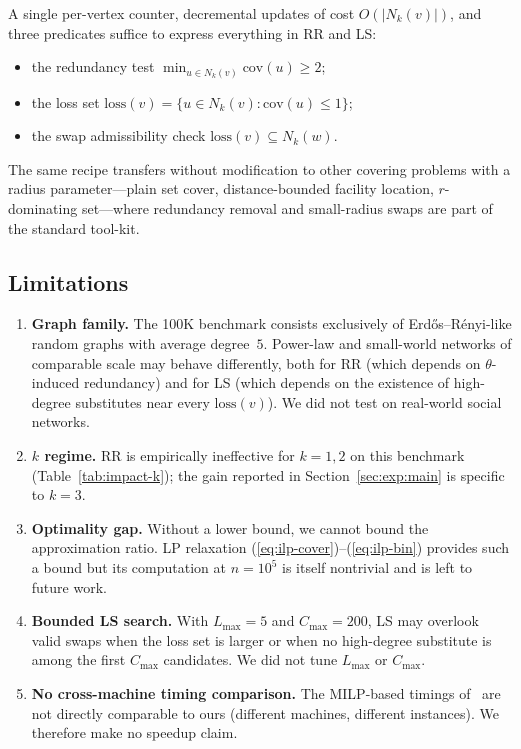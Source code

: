 \documentclass[11pt,a4paper]{article}
\newcommand{\cov}{\mathrm{cov}}
\newcommand{\loss}{\mathrm{loss}}
\begin{document}
A single per-vertex counter, decremental updates of cost
$O(|N_k(v)|)$, and three predicates suffice to express everything in
RR and LS:
\begin{itemize}[nosep]
  \item the redundancy test $\min_{u\in N_k(v)}\cov(u)\ge 2$;
  \item the loss set $\loss(v)=\{u\in N_k(v):\cov(u)\le 1\}$;
  \item the swap admissibility check $\loss(v)\subseteq N_k(w)$.
\end{itemize}
The same recipe transfers without modification to other covering
problems with a radius parameter—plain set cover, distance-bounded
facility location, $r$-dominating set—where redundancy removal and
small-radius swaps are part of the standard tool-kit.


\subsection{Limitations}

\begin{enumerate}[nosep]
  \item \textbf{Graph family.} The 100K benchmark consists exclusively
    of Erd\H{o}s--R\'enyi-like random graphs with average degree~$5$.
    Power-law and small-world networks of comparable scale may behave
    differently, both for RR (which depends on $\theta$-induced
    redundancy) and for LS (which depends on the existence of
    high-degree substitutes near every $\loss(v)$). We did not test on
    real-world social networks.
  \item \textbf{$k$ regime.} RR is empirically ineffective for
    $k=1,2$ on this benchmark
    (Table~\ref{tab:impact-k}); the gain reported in
    Section~\ref{sec:exp:main} is specific to $k=3$.
  \item \textbf{Optimality gap.} Without a lower bound, we cannot bound
    the approximation ratio. LP relaxation
    (\ref{eq:ilp-cover})--(\ref{eq:ilp-bin}) provides such a bound but
    its computation at $n=10^5$ is itself nontrivial and is left to
    future work.
  \item \textbf{Bounded LS search.} With $L_{\max}=5$ and
    $C_{\max}=200$, LS may overlook valid swaps when the loss set is
    larger or when no high-degree substitute is among the first
    $C_{\max}$ candidates. We did not tune $L_{\max}$ or $C_{\max}$.
  \item \textbf{No cross-machine timing comparison.} The MILP-based
    timings of~\cite{nguyen2020} are not directly comparable to ours
    (different machines, different instances). We therefore make no
    speedup claim.
\end{enumerate}
\end{document}
